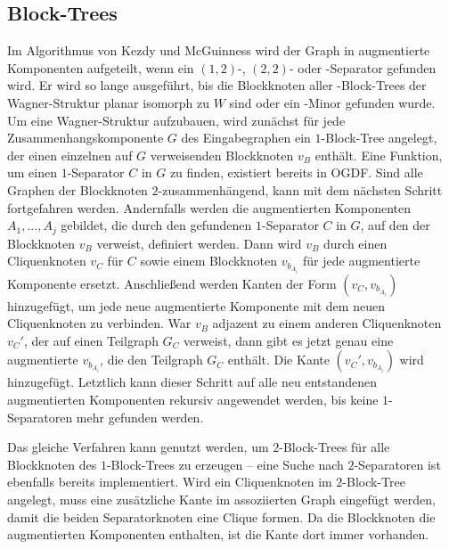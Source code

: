 \subsection{Block-Trees}
Im Algorithmus von Kezdy und McGuinness wird der Graph in augmentierte Komponenten aufgeteilt, wenn ein $(1, 2)$-, $(2, 2)$- oder \dd-Separator gefunden wird.
Er wird so lange ausgeführt, bis die Blockknoten aller \dd-Block-Trees der Wagner-Struktur planar \bzw isomorph zu $W$ sind oder ein \kf-Minor gefunden wurde.
Um eine Wagner-Struktur aufzubauen, wird zunächst für jede Zusammenhangskomponente $G$ des Eingabegraphen ein $1$-Block-Tree angelegt, der einen einzelnen auf $G$ verweisenden Blockknoten $v_B$ enthält.
Eine Funktion, um einen $1$-Separator $C$ in $G$ zu finden, existiert bereits in OGDF.
Sind alle Graphen der Blockknoten $2$-zusammenhängend, kann mit dem nächsten Schritt fortgefahren werden.
Andernfalls werden die augmentierten Komponenten $A_1, ..., A_j$ gebildet, die durch den gefundenen $1$-Separator $C$ in $G$, auf den der Blockknoten $v_B$ verweist, definiert werden.
Dann wird $v_B$ durch einen Cliquenknoten $v_C$ für $C$ sowie einem Blockknoten $v_{b_{A_i}}$ für jede augmentierte Komponente ersetzt.
Anschließend werden Kanten der Form $(v_C, v_{b_{A_i}})$ hinzugefügt, um jede neue augmentierte Komponente mit dem neuen Cliquenknoten zu verbinden.
War $v_B$ adjazent zu einem anderen Cliquenknoten $v_C'$, der auf einen Teilgraph $G_C$ verweist, dann gibt es jetzt genau eine augmentierte $v_{b_{A_i}}$, die den Teilgraph $G_C$ enthält.
Die Kante $(v_C', v_{b_{A_i}})$ wird hinzugefügt.
Letztlich kann dieser Schritt auf alle neu entstandenen augmentierten Komponenten rekursiv angewendet werden, bis keine $1$-Separatoren mehr gefunden werden.

Das gleiche Verfahren kann genutzt werden, um $2$-Block-Trees für alle Blockknoten des $1$-Block-Trees zu erzeugen -- eine Suche nach $2$-Separatoren ist ebenfalls bereits implementiert.
Wird ein Cliquenknoten im $2$-Block-Tree angelegt, muss \ggf eine zusätzliche Kante im assoziierten Graph eingefügt werden, damit die beiden Separatorknoten eine Clique formen.
Da die Blockknoten die augmentierten Komponenten enthalten, ist die Kante dort immer vorhanden.

